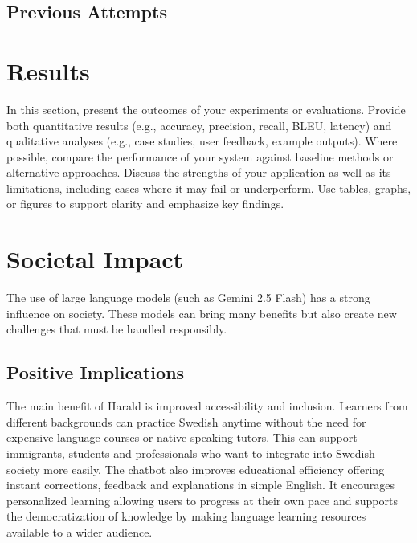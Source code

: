 \documentclass[a4paper,10pt]{article}
\begin{document}
\subsection{Previous Attempts}

\section{Results}
In this section, present the outcomes of your experiments or evaluations. Provide both quantitative results (e.g., accuracy, precision, recall, BLEU, latency) and qualitative analyses (e.g., case studies, user feedback, example outputs). Where possible, compare the performance of your system against baseline methods or alternative approaches. Discuss the strengths of your application as well as its limitations, including cases where it may fail or underperform. Use tables, graphs, or figures to support clarity and emphasize key findings.

\section{Societal Impact}
The use of large language models (such as Gemini 2.5 Flash) has a strong influence on society. These models can bring many benefits but also create new challenges that must be handled responsibly.

\subsection{Positive Implications}
The main benefit of Harald is improved accessibility and inclusion. Learners from different backgrounds can practice Swedish anytime without the need for expensive language courses or native-speaking tutors. This can support immigrants, students and professionals who want to integrate into Swedish society more easily. The chatbot also improves educational efficiency offering instant corrections, feedback and explanations in simple English. It encourages personalized learning allowing users to progress at their own pace and supports the democratization of knowledge by making language learning resources available to a wider audience.
\end{document}
